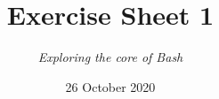 




\title{{\vspace{-12mm}\huge\textbf{Exercise Sheet 1}}}
\author{\textit{Exploring the core of Bash}}
\date{{\small 26 October 2020}}


    \maketitle
    \bigskip
    
    \bigskip
    
    \bigskip
    
    \bigskip
    
    \bigskip
    
    \bigskip
    
